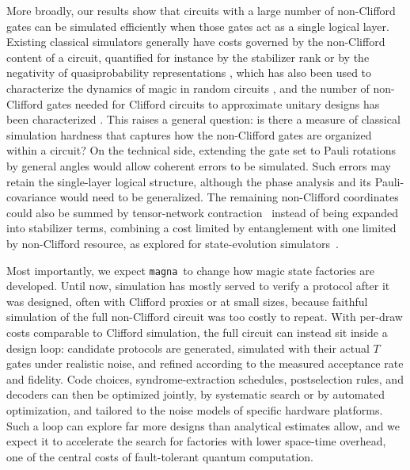 \documentclass[aps,prx,twocolumn,superscriptaddress,longbibliography]{revtex4-2}
\newcommand{\simname}{\texttt{magna}}
\begin{document}
More broadly, our results show that circuits with a large number of non-Clifford gates
can be simulated efficiently when those gates act as a single logical layer.
Existing classical simulators generally have costs governed by the non-Clifford content of a circuit,
quantified for instance by the stabilizer rank \cite{bravyiImprovedClassicalSimulation2016}
or by the negativity of quasiprobability representations \cite{pashayanEstimatingOutcomeProbabilities2015}, 
which has also been used to characterize the dynamics of magic in random circuits \cite{zhangQuantumMagicDynamics2024},
and the number of non-Clifford gates needed for Clifford circuits to approximate unitary designs
has been characterized \cite{zhangDesignsMagicaugmentedClifford2025}.
This raises a general question:
is there a measure of classical simulation hardness that captures
how the non-Clifford gates are organized within a circuit?  
On the technical side, extending the gate set to Pauli rotations by general angles
would allow coherent errors to be simulated.
Such errors may retain the single-layer logical structure,
although the phase analysis and its Pauli-covariance would need to be generalized.
The remaining non-Clifford coordinates could also be summed by tensor-network contraction~\cite{markovSimulatingQuantumComputation2008}
instead of being expanded into stabilizer terms,
combining a cost limited by entanglement with one limited by non-Clifford resource,
as explored for state-evolution simulators~\cite{hartwegComparingMagicState2026}.



Most importantly, we expect \simname\ to change how magic state factories are developed.
Until now, simulation has mostly served to verify a protocol after it was designed,
often with Clifford proxies or at small sizes,
because faithful simulation of the full non-Clifford circuit was too costly to repeat.
With per-draw costs comparable to Clifford simulation,
the full circuit can instead sit inside a design loop:
candidate protocols are generated, simulated with their actual $T$ gates under realistic noise,
and refined according to the measured acceptance rate and fidelity.
Code choices, syndrome-extraction schedules, postselection rules, and decoders
can then be optimized jointly,
by systematic search or by automated optimization,
and tailored to the noise models of specific hardware platforms.
Such a loop can explore far more designs than analytical estimates allow,
and we expect it to accelerate the search for factories with lower space-time overhead,
one of the central costs of fault-tolerant quantum computation.
\end{document}
